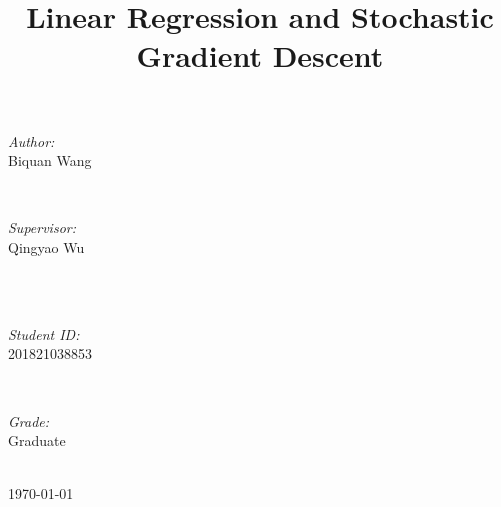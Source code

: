 \documentclass[journal, a4paper]{IEEEtran}
\begin{document}
\begin{titlepage}
\begin{minipage}{0.4\textwidth}
\begin{flushleft} \large
\emph{Author:}\\
Biquan Wang %
\end{flushleft}
\end{minipage}
~
\begin{minipage}{0.4\textwidth}
\begin{flushright} \large
\emph{Supervisor:} \\
Qingyao Wu %
\end{flushright}
\end{minipage}\\[2cm]
~
\begin{minipage}{0.4\textwidth}
\begin{flushleft} \large
\emph{Student ID:}\\
201821038853
\end{flushleft}
\end{minipage}
~
\begin{minipage}{0.4\textwidth}
\begin{flushright} \large
\emph{Grade:} \\
Graduate
\end{flushright}
\end{minipage}\\[2cm]



{\large \today}\\[2cm] %

 

\vfill %

\end{titlepage}

	\title{Linear Regression and Stochastic Gradient Descent}
	\maketitle
\end{document}
